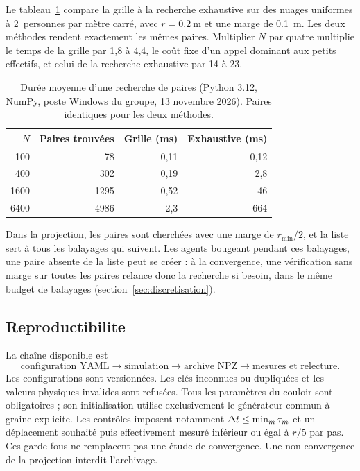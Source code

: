 Le tableau~\ref{tab:voisins} compare la grille à la recherche exhaustive sur des
nuages uniformes à \num{2}~personnes par mètre carré, avec $r=\SI{0.2}{\metre}$
et une marge de \SI{0.1}{\metre}. Les deux méthodes rendent exactement les mêmes
paires. Multiplier $N$ par quatre multiplie le temps de la grille par 1,8 à 4,4,
le coût fixe d'un appel dominant aux petits effectifs, et celui de la recherche
exhaustive par 14 à 23.

\begin{table}[ht]
\centering
\caption{Durée moyenne d'une recherche de paires (Python 3.12, NumPy, poste
Windows du groupe, 13 novembre 2026). Paires identiques pour les deux méthodes.}
\label{tab:voisins}
\begin{tabular}{rrrr}
\toprule
$N$ & Paires trouvées & Grille (ms) & Exhaustive (ms) \\
\midrule
100 & 78 & 0,11 & 0,12 \\
400 & 302 & 0,19 & 2,8 \\
1600 & \num{1295} & 0,52 & 46 \\
6400 & \num{4986} & 2,3 & 664 \\
\bottomrule
\end{tabular}
\end{table}

Dans la projection, les paires sont cherchées avec une marge de $r_{\min}/2$,
et la liste sert à tous les balayages qui suivent. Les agents bougeant pendant
ces balayages, une paire absente de la liste peut se créer : à la convergence, une
vérification sans marge sur toutes les paires relance donc la recherche si
besoin, dans le même budget de balayages (section~\ref{sec:discretisation}).

\subsection{Reproductibilite}

La chaîne disponible est
\[
\text{configuration YAML} \longrightarrow \text{simulation}
\longrightarrow \text{archive NPZ} \longrightarrow \text{mesures et relecture}.
\]
Les configurations sont versionnées. Les clés inconnues ou dupliquées et les valeurs
physiques invalides sont refusées. Tous les paramètres du couloir sont obligatoires ;
son initialisation utilise exclusivement le générateur commun à graine explicite.
Les contrôles imposent notamment $\Delta t\leq\min_m\tau_m$ et un déplacement souhaité
puis effectivement mesuré inférieur ou égal à $r/5$ par pas. Ces garde-fous ne remplacent
pas une étude de convergence. Une non-convergence de la projection interdit l'archivage.


